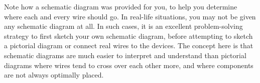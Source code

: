 





Note how a schematic diagram was provided for you, to help you determine where each and every wire should go.  In real-life situations, you may not be given any schematic diagram at all.  In such cases, it is an excellent problem-solving strategy to first sketch your own schematic diagram, before attempting to sketch a pictorial diagram or connect real wires to the devices.  The concept here is that schematic diagrams are much easier to interpret and understand than pictorial diagrams where wires tend to cross over each other more, and where components are not always optimally placed.




